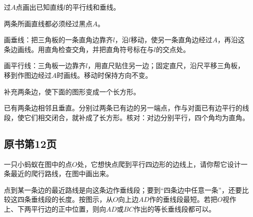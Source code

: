 过\(A\)点画出已知直线\(l\)的平行线和垂线。\par
{}
\begin{BookAnswer}
两条所画直线都必须经过黑点\(A\)。\par 画垂线：把三角板的一条直角边靠齐\(l\)，沿\(l\)移动，使另一条直角边经过\(A\)，再沿这条边画线。用直角检查交角，并把直角符号标在与\(l\)的交点处。\par 画平行线：三角板一边靠齐\(l\)，用直尺贴住另一边；固定直尺，沿尺平移三角板，移到作图边经过\(A\)时画线。移动时保持方向不变。
\end{BookAnswer}

补充两条边，使下面的图形变成一个长方形。\par
{}
\begin{BookAnswer}
已有两条边相邻且垂直。分别过两条已有边的另一端点，作与对面已有边平行的线段，使它们相交闭合，就补成了长方形。核对：对边分别平行，四个角均为直角。
\end{BookAnswer}



\subsection*{原书第12页}

一只小蚂蚁在图中的点\(O\)处，它想快点爬到平行四边形的边线上，请你帮它设计一条最近的爬行路线，在图中画出来。\par
{}
\begin{BookAnswer}
点到某一条边的最近路线是向这条边作垂线段；要到“四条边中任意一条”，还要比较这四条垂线段的长度。按图示，从\(O\)向上边\(AD\)作的垂线段最短。若把\(O\)视作上、下两平行边的正中位置，则向\(AD\)或\(BC\)作出的等长垂线段都可以。
\end{BookAnswer}

